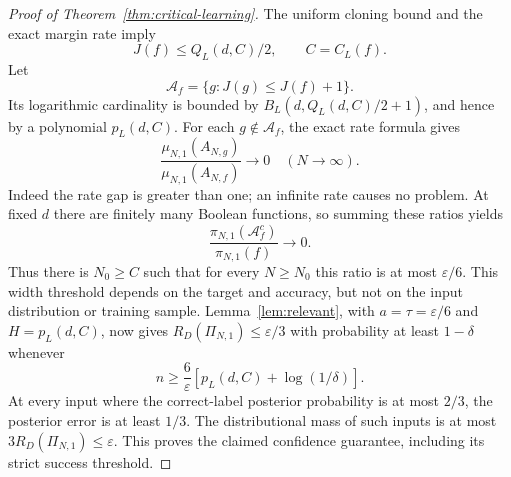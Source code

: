 \begin{proof}[Proof of Theorem~\ref{thm:critical-learning}]
The uniform cloning bound and the exact margin rate imply
\[
 J(f)\leq Q_L(d,C)/2,\qquad C=C_L(f).
\]
Let
\[
 \mathcal A_f=\{g:J(g)\leq J(f)+1\}.
\]
Its logarithmic cardinality is bounded by
$B_L(d,Q_L(d,C)/2+1)$, and hence by a polynomial $p_L(d,C)$.
For each $g\notin\mathcal A_f$, the exact rate formula gives
\[
 \frac{\mu_{N,1}(A_{N,g})}{\mu_{N,1}(A_{N,f})}\longrightarrow0
 \quad(N\to\infty).
\]
Indeed the rate gap is greater than one; an infinite rate causes no
problem. At fixed $d$ there are finitely many Boolean functions, so
summing these ratios yields
\[
 \frac{\pi_{N,1}(\mathcal A_f^c)}{\pi_{N,1}(f)}\longrightarrow0.
\]
Thus there is $N_0\geq C$ such that for every $N\geq N_0$ this ratio is
at most $\varepsilon/6$. This width threshold depends on the target and
accuracy, but not on the input distribution or training sample.
Lemma~\ref{lem:relevant}, with $a=\tau=\varepsilon/6$ and
$H=p_L(d,C)$, now gives $R_D(\Pi_{N,1})\leq\varepsilon/3$ with
probability at least $1-\delta$ whenever
\[
 n\geq\frac6\varepsilon[p_L(d,C)+\log(1/\delta)].
\]
At every input where the correct-label posterior probability is at most
$2/3$, the posterior error is at least $1/3$. The distributional mass of
such inputs is at most $3R_D(\Pi_{N,1})\leq\varepsilon$.
This proves the claimed confidence guarantee, including its strict
success threshold.
\end{proof}

